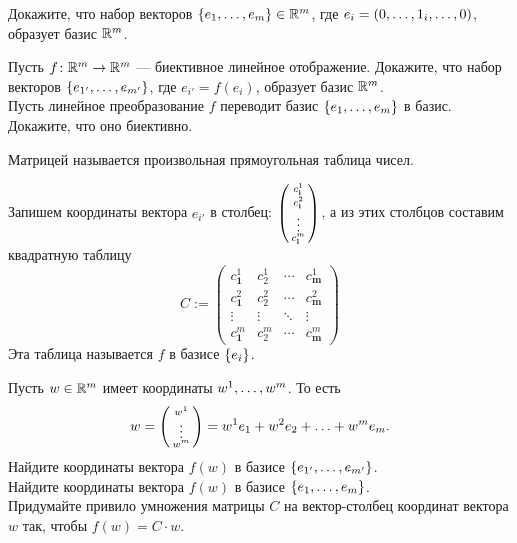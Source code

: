 \documentclass[a4paper,12pt]{article}
\begin{document}

    Докажите, что набор векторов $\left\{e_1,\ldots, e_m\right\}\in\mathbb{R}^m$, где $e_i=(0,\ldots,1_i,\ldots,0)$, образует базис $\mathbb{R}^m$.

    Пусть $f\colon\mathbb{R}^m\rightarrow\mathbb{R}^m$ --- биективное линейное отображение. Докажите, что набор векторов $\left\{e_{1'},\ldots, e_{m'}\right\}$, где $e_{i'}=f(e_i)$, образует базис $\mathbb{R}^m$.\\
    Пусть линейное преобразование $f$ переводит базис $\left\{e_1,\ldots, e_m\right\}$ в базис. Докажите, что оно биективно.

     Матрицей называется произвольная прямоугольная таблица чисел.

    Запишем координаты вектора $e_{i'}$ в столбец: $\left(\begin{smallmatrix}c^1_\textbf{i}\\c^2_\textbf{i}\\\vdots\\c^m_\textbf{i}\end{smallmatrix}\right)$, а из этих столбцов составим квадратную таблицу
    $$C:=
    \begin{pmatrix}
    c^1_\textbf{1}&c^1_2&\cdots&c^1_\textbf{m}\\
    c^2_\textbf{1}&c^2_2&\cdots&c^2_\textbf{m}\\
    \vdots&\vdots&\ddots&\vdots\\
    c^m_\textbf{1}&c^m_2&\cdots&c^m_\textbf{m}
    \end{pmatrix}
    $$
    Эта таблица называется  $f$ в базисе $\left\{e_i\right\}$.


    Пусть $w\in\mathbb{R}^m$ имеет координаты $w^1,\ldots, w^m$. То есть
    $$ w = \left(\begin{smallmatrix}w^1\\\vdots\\w^m\end{smallmatrix}\right) = w^1 e_1 + w^2 e_2 + \ldots +  w^m e_m.$$
    Найдите координаты вектора $f(w)$ в базисе $\left\{e_{1'},\ldots, e_{m'}\right\}$.\\
    Найдите координаты вектора $f(w)$ в базисе $\left\{e_{1},\ldots, e_{m}\right\}$.\\
    Придумайте привило умножения матрицы $C$ на вектор-столбец координат вектора $w$ так, чтобы $f(w) = C\cdot w$.
\end{document}
